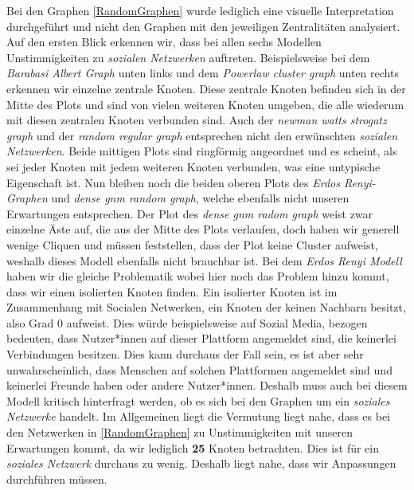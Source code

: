 Bei den Graphen \ref{RandomGraphen} wurde lediglich eine visuelle Interpretation durchgeführt und nicht den Graphen mit den jeweiligen Zentralitäten analysiert. Auf den ersten Blick erkennen wir, dass bei allen sechs Modellen Unstimmigkeiten zu \textit{sozialen Netzwerken} auftreten. Beispielsweise bei dem \textit{Barabasi Albert Graph} unten links und dem \textit{Powerlaw cluster graph} unten rechts erkennen wir einzelne zentrale Knoten. Diese zentrale Knoten befinden sich in der Mitte des Plots und sind von vielen weiteren Knoten umgeben, die alle wiederum mit diesen zentralen Knoten verbunden sind. Auch der \textit{newman watts strogatz graph} und der \textit{random regular graph} entsprechen nicht den erwünschten \textit{sozialen Netzwerken}. Beide mittigen Plots sind ringförmig angeordnet und es scheint, als sei jeder Knoten mit jedem weiteren Knoten verbunden, was eine untypische Eigenschaft ist. Nun bleiben noch die beiden oberen Plots des \textit{Erdos Renyi-Graphen} und \textit{dense gnm random graph}, welche ebenfalls nicht unseren Erwartungen entsprechen. Der Plot des \textit{dense gnm radom graph} weist zwar einzelne Äste auf, die aus der Mitte des Plots verlaufen, doch haben wir generell wenige Cliquen und müssen feststellen, dass der Plot keine Cluster aufweist, weshalb dieses Modell ebenfalls nicht brauchbar ist. Bei dem \textit{Erdos Renyi Modell} haben wir die gleiche Problematik wobei hier noch das Problem hinzu kommt, dass wir einen isolierten Knoten finden. Ein isolierter Knoten ist im Zusammenhang mit Socialen Netwerken, ein Knoten der keinen Nachbarn besitzt, also Grad $0$ aufweist.
Dies würde beispielsweise auf Sozial Media, bezogen bedeuten, dass Nutzer*innen auf dieser Plattform angemeldet sind, die keinerlei Verbindungen besitzen. Dies kann durchaus der Fall sein, es ist aber sehr unwahrscheinlich, dass Menschen auf solchen Plattformen angemeldet sind und keinerlei Freunde haben oder andere Nutzer*innen. Deshalb muss auch bei diesem Modell kritisch hinterfragt werden, ob es sich bei den Graphen um ein \textit{soziales Netzwerke} handelt. Im Allgemeinen liegt die Vermutung liegt nahe, dass es bei den Netzwerken in \ref{RandomGraphen} zu Unstimmigkeiten mit unseren Erwartungen kommt, da wir lediglich \textbf{25} Knoten betrachten. Dies ist für ein \textit{soziales Netzwerk} durchaus zu wenig. Deshalb liegt nahe, dass wir Anpassungen durchführen müssen.

